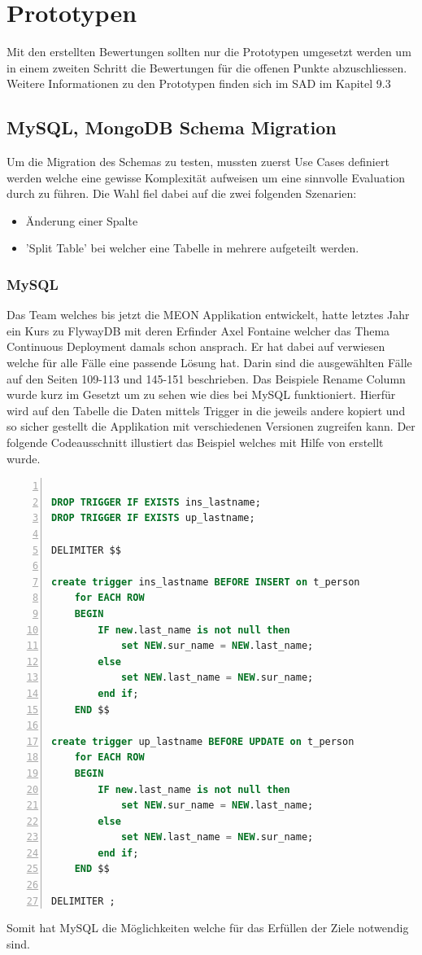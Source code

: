 \section{Prototypen}

Mit den erstellten Bewertungen sollten nur die Prototypen umgesetzt werden um in einem zweiten Schritt die Bewertungen für die offenen Punkte abzuschliessen. Weitere Informationen zu den Prototypen finden sich im SAD im Kapitel 9.3

\subsection{MySQL, MongoDB Schema Migration}

Um die Migration des Schemas zu testen, mussten zuerst Use Cases definiert werden welche eine gewisse Komplexität aufweisen um eine sinnvolle Evaluation durch zu führen. Die Wahl fiel dabei auf die zwei folgenden Szenarien:
\begin{itemize}
	\item Änderung einer Spalte
	\item 'Split Table' bei welcher eine Tabelle in mehrere aufgeteilt werden.
\end{itemize}
\newpage
\subsubsection{MySQL}

Das Team welches bis jetzt die MEON Applikation entwickelt, hatte letztes Jahr ein Kurs zu FlywayDB mit deren Erfinder Axel Fontaine  welcher das Thema Continuous Deployment damals schon ansprach. Er hat dabei auf \cite{rd} verwiesen welche für alle Fälle eine passende Lösung hat. Darin sind die ausgewählten Fälle auf den Seiten 109-113 und 145-151 beschrieben. Das Beispiele Rename Column wurde kurz im Gesetzt um zu sehen wie dies bei MySQL funktioniert. Hierfür wird auf den Tabelle die Daten mittels Trigger in die jeweils andere kopiert und so sicher gestellt die Applikation mit verschiedenen Versionen zugreifen kann. Der folgende Codeausschnitt illustiert das Beispiel welches mit Hilfe von \cite{mysqltrigger} erstellt wurde.

\begin{lstlisting}[language=SQL, showspaces=false, basicstyle=\ttfamily, numbers=left, numberstyle=\tiny, commentstyle=\color{gray}]

DROP TRIGGER IF EXISTS ins_lastname;
DROP TRIGGER IF EXISTS up_lastname;

DELIMITER $$

create trigger ins_lastname BEFORE INSERT on t_person 
	for EACH ROW
	BEGIN
		IF new.last_name is not null then
			set NEW.sur_name = NEW.last_name;
		else
			set NEW.last_name = NEW.sur_name;
		end if;
	END $$

create trigger up_lastname BEFORE UPDATE on t_person
	for EACH ROW
	BEGIN
		IF new.last_name is not null then
			set NEW.sur_name = NEW.last_name;
		else
			set NEW.last_name = NEW.sur_name;
		end if;
	END $$

DELIMITER ;

\end{lstlisting}
Somit hat MySQL die Möglichkeiten welche für das Erfüllen der Ziele notwendig sind.
\newpage
